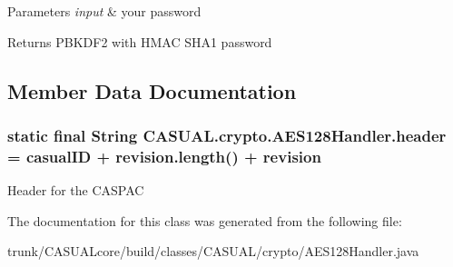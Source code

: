 \begin{DoxyParams}{Parameters}
{\em input} & your password \\
\hline
\end{DoxyParams}
\begin{DoxyReturn}{Returns}
P\-B\-K\-D\-F2 with H\-M\-A\-C S\-H\-A1 password 
\end{DoxyReturn}


\subsection{Member Data Documentation}
\hypertarget{class_c_a_s_u_a_l_1_1crypto_1_1_a_e_s128_handler_a3ae1cd854002227282c4e2fe7381dfbc}{
\subsubsection[{header}]{\setlength{\rightskip}{0pt plus 5cm}static final String C\-A\-S\-U\-A\-L.\-crypto.\-A\-E\-S128\-Handler.\-header = casual\-I\-D + revision.\-length() + revision\hspace{0.3cm}{\ttfamily [static]}}}\label{class_c_a_s_u_a_l_1_1crypto_1_1_a_e_s128_handler_a3ae1cd854002227282c4e2fe7381dfbc}
Header for the C\-A\-S\-P\-A\-C 

The documentation for this class was generated from the following file\-:\begin{DoxyCompactItemize}
\item 
trunk/\-C\-A\-S\-U\-A\-Lcore/build/classes/\-C\-A\-S\-U\-A\-L/crypto/A\-E\-S128\-Handler.\-java\end{DoxyCompactItemize}
